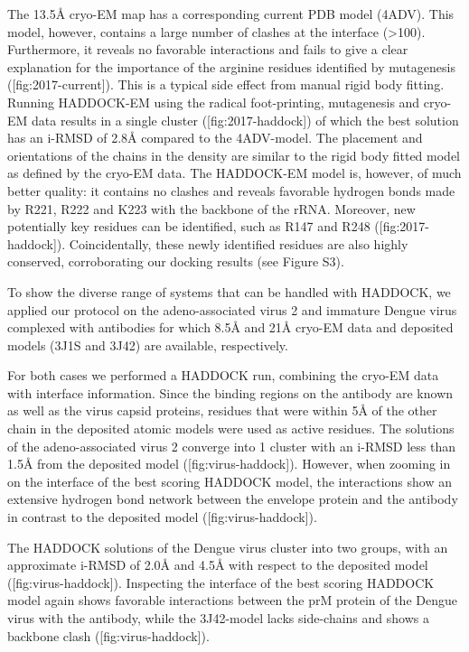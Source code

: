 The 13.5Å cryo-EM map has a corresponding current PDB model (4ADV). This model,
however, contains a large number of clashes at the interface (>100).
Furthermore, it reveals no favorable interactions and fails to give a clear
explanation for the importance of the arginine residues identified by
mutagenesis ([fig:2017-current]).  This is a typical side effect
from manual rigid body fitting.  Running HADDOCK-EM using the radical
foot-printing, mutagenesis and cryo-EM data results in a single cluster
([fig:2017-haddock]) of which the best solution has an i-RMSD of
2.8Å compared to the 4ADV-model.  The placement and orientations of the chains
in the density are similar to the rigid body fitted model as defined by the
cryo-EM data.  The HADDOCK-EM model is, however, of much better quality: it
contains no clashes and reveals favorable hydrogen bonds made by R221, R222 and
K223 with the backbone of the rRNA.  Moreover, new potentially key residues can
be identified, such as R147 and R248 ([fig:2017-haddock]).
Coincidentally, these newly identified residues are also highly conserved,
corroborating our docking results (see Figure S3).



{}

To show the diverse range of systems that can be handled with HADDOCK, we
applied our protocol on the adeno-associated virus 2 and immature Dengue virus
complexed with antibodies for which 8.5Å and 21Å cryo-EM data and deposited
models (3J1S and 3J42) are available, respectively.

For both cases we performed a HADDOCK run, combining the cryo-EM data with
interface information. Since the binding regions on the antibody are known as
well as the virus capsid proteins, residues that were within 5Å of the other
chain in the deposited atomic models were used as active residues.  The
solutions of the adeno-associated virus 2 converge into 1 cluster with an
i-RMSD less than 1.5Å from the deposited model
([fig:virus-haddock]).  However, when zooming in on the interface
of the best scoring HADDOCK model, the interactions show an extensive hydrogen
bond network between the envelope protein and the antibody in contrast to the
deposited model ([fig:virus-haddock]). 

The HADDOCK solutions of the Dengue virus cluster into two groups, with an
approximate i-RMSD of 2.0Å and 4.5Å with respect to the deposited model
([fig:virus-haddock]).  Inspecting the interface of the best
scoring HADDOCK model again shows favorable interactions between the prM
protein of the Dengue virus with the antibody, while the 3J42-model lacks
side-chains and shows a backbone clash ([fig:virus-haddock]). 

